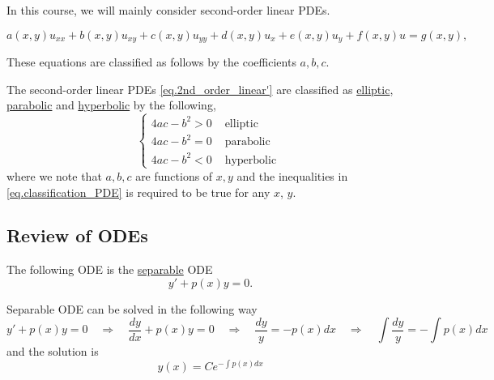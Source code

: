 In this course, we will mainly consider second-order linear PDEs.

\begin{equation}\label{eq.2nd_order_linear'}
    a(x, y) u_{x x}+b(x, y) u_{x y}+c(x, y) u_{y y}+d(x, y) u_x+e(x, y) u_y+f(x, y) u=g(x, y),
\end{equation}

These equations are classified as follows by the coefficients $a, b, c$.

\begin{definition} The second-order linear PDEs \eqref{eq.2nd_order_linear'} are classified as \underline{elliptic}, \underline{parabolic} and \underline{hyperbolic} by the following,
    \begin{equation}\label{eq.classification_PDE}
        \begin{cases}
            4 a c-b^2>0 & \text { elliptic } 
            \\ 
            4 a c-b^2=0 & \text { parabolic } 
            \\ 
            4 a c-b^2<0 & \text { hyperbolic }
        \end{cases}
    \end{equation}
where we note that $a, b, c$ are functions of $x, y$ and the inequalities in \eqref{eq.classification_PDE} is required to be true for any $x$, $y$.
\end{definition}


\subsection{Review of ODEs}

\begin{definition}
    The following ODE is the \underline{separable} ODE
    \begin{equation}\label{eq.separable}
        y' + p(x)y = 0.
    \end{equation}
\end{definition}

\begin{theorem}[]\label{th.separable_ODE}
    Separable ODE can be solved in the following way
    \begin{equation*}
        y' + p(x)y = 0
        \quad\Rightarrow\quad \frac{dy}{dx} + p(x)y = 0 \quad\Rightarrow\quad \frac{dy}{y} = - p(x)dx
        \quad\Rightarrow\quad
        \int \frac{dy}{y} = - \int p(x)dx
    \end{equation*}
    and the solution is 
    \begin{equation}\label{eq.sol_separable}
        y(x) = Ce^{-\int p(x)dx}
    \end{equation}
\end{theorem}


